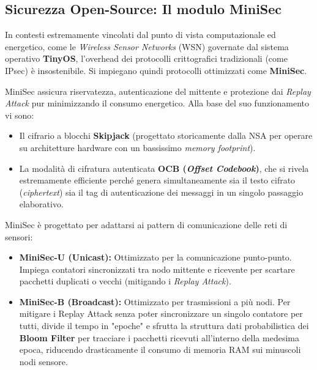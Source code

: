 \subsection{Sicurezza Open-Source: Il modulo MiniSec}
In contesti estremamente vincolati dal punto di vista computazionale ed energetico, come le \textit{Wireless Sensor Networks} (WSN) governate dal sistema operativo \textbf{TinyOS}, l'overhead dei protocolli crittografici tradizionali (come IPsec) è insostenibile. Si impiegano quindi protocolli ottimizzati come \textbf{MiniSec}.

MiniSec assicura riservatezza, autenticazione del mittente e protezione dai \textit{Replay Attack} pur minimizzando il consumo energetico. Alla base del suo funzionamento vi sono:
\begin{itemize}
    \item Il cifrario a blocchi \textbf{Skipjack} (progettato storicamente dalla NSA per operare su architetture hardware con un bassissimo \textit{memory footprint}).
    \item La modalità di cifratura autenticata \textbf{OCB (\textit{Offset Codebook})}, che si rivela estremamente efficiente perché genera simultaneamente sia il testo cifrato (\textit{ciphertext}) sia il tag di autenticazione dei messaggi in un singolo passaggio elaborativo.
\end{itemize}

\begin{exbox}
MiniSec è progettato per adattarsi ai pattern di comunicazione delle reti di sensori:
\begin{itemize}
    \item \textbf{MiniSec-U (Unicast):} Ottimizzato per la comunicazione punto-punto. Impiega contatori sincronizzati tra nodo mittente e ricevente per scartare pacchetti duplicati o vecchi (mitigando i \textit{Replay Attack}).
    \item \textbf{MiniSec-B (Broadcast):} Ottimizzato per trasmissioni a più nodi. Per mitigare i Replay Attack senza poter sincronizzare un singolo contatore per tutti, divide il tempo in "epoche" e sfrutta la struttura dati probabilistica dei \textbf{Bloom Filter} per tracciare i pacchetti ricevuti all'interno della medesima epoca, riducendo drasticamente il consumo di memoria RAM sui minuscoli nodi sensore.
\end{itemize}
\end{exbox}
